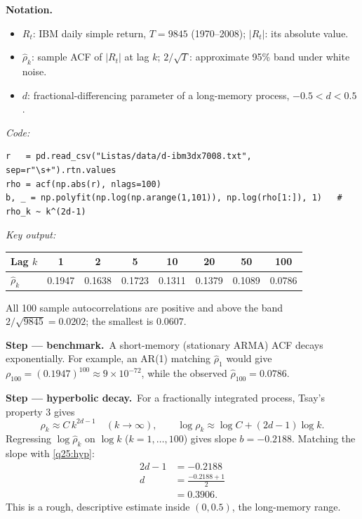 \documentclass[11pt,a4paper]{article}
\newenvironment{notacao}{\par\smallskip\noindent\textbf{Notation.}\begin{itemize}[leftmargin=1.4em,topsep=1pt,itemsep=0pt]\small}{\end{itemize}}
\newcommand{\passo}[2]{\par\smallskip\noindent\textbf{Step --- #1.}~#2}
\begin{document}
\begin{sol}
\begin{notacao}
\item $R_t$: IBM daily simple return, $T=9845$ (1970--2008); $|R_t|$: its absolute value.
\item $\hat\rho_k$: sample ACF of $|R_t|$ at lag $k$; $2/\sqrt T$: approximate 95\% band under white noise.
\item $d$: fractional-differencing parameter of a long-memory process, $-0.5<d<0.5$.
\end{notacao}

\noindent\textit{Code:}
\begingroup\footnotesize
\begin{verbatim}
r   = pd.read_csv("Listas/data/d-ibm3dx7008.txt", sep=r"\s+").rtn.values
rho = acf(np.abs(r), nlags=100)
b, _ = np.polyfit(np.log(np.arange(1,101)), np.log(rho[1:]), 1)   # rho_k ~ k^(2d-1)
\end{verbatim}
\endgroup
\noindent\textit{Key output:}
\begin{center}\small
\begin{tabular}{lccccccc}
\toprule
Lag $k$ & 1 & 2 & 5 & 10 & 20 & 50 & 100\\
\midrule
$\hat\rho_k$ & 0.1947 & 0.1638 & 0.1723 & 0.1311 & 0.1379 & 0.1089 & 0.0786\\
\bottomrule
\end{tabular}
\end{center}
All 100 sample autocorrelations are positive and above the band $2/\sqrt{9845}=0.0202$; the smallest is $0.0607$.

\passo{benchmark}{A short-memory (stationary ARMA) ACF decays exponentially. For example, an AR(1)
matching $\hat\rho_1$ would give $\rho_{100}=(0.1947)^{100}\approx 9\times10^{-72}$, while the observed
$\hat\rho_{100}=0.0786$.}
\passo{hyperbolic decay}{For a fractionally integrated process, Tsay's property 3 gives}
\begin{equation}\label{q25:hyp} \rho_k \approx C\,k^{2d-1}\quad (k\to\infty),\qquad \log\rho_k\approx \log C+(2d-1)\log k . \end{equation}
Regressing $\log\hat\rho_k$ on $\log k$ ($k=1,\dots,100$) gives slope $b=-0.2188$. Matching the slope with \eqref{q25:hyp}:
\begin{align*}
2d-1 &= -0.2188\\
d &= \frac{-0.2188+1}{2}\\
&= 0.3906 .
\end{align*}
This is a rough, descriptive estimate inside $(0,0.5)$, the long-memory range.


\end{sol}
\end{document}
